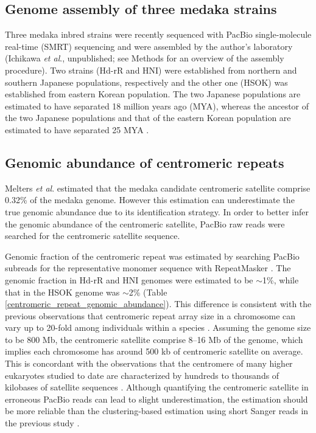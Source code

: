 \subsection*{Genome assembly of three medaka strains}
  Three medaka inbred strains were recently sequenced with PacBio single-molecule real-time (SMRT) sequencing and were assembled by the author's laboratory (Ichikawa \textit{et al}., unpublished; see Methods for an overview of the assembly procedure). Two strains (Hd-rR and HNI) were established from northern and southern Japanese populations, respectively and the other one (HSOK) was established from eastern Korean population. The two Japanese populations are estimated to have separated 18 million years ago (MYA), whereas the ancestor of the two Japanese populations and that of the eastern Korean population are estimated to have separated 25 MYA \cite{Setiamarga2009}.



\subsection*{Genomic abundance of centromeric repeats}
  Melters \textit{et al}. \cite{Melters2013} estimated that the medaka candidate centromeric satellite comprise 0.32\% of the medaka genome. However this estimation can underestimate the true genomic abundance due to its identification strategy. In order to better infer the genomic abundance of the centromeric satellite, PacBio raw reads were searched for the centromeric satellite sequence.

  Genomic fraction of the centromeric repeat was estimated by searching PacBio subreads for the representative monomer sequence with RepeatMasker \cite{}. The genomic fraction in Hd-rR and HNI genomes were estimated to be $\sim$1\%, while that in the HSOK genome was $\sim$2\% (Table \ref{centromeric_repeat_genomic_abundance}). This difference is consistent with the previous observations that centromeric repeat array size in a chromosome can vary up to 20-fold among individuals within a species \cite{Miga2014}. Assuming the genome size to be 800 Mb, the centromeric satellite comprise 8--16 Mb of the genome, which implies each chromosome has around 500 kb of centromeric satellite on average. This is concordant with the observations that the centromere of many higher eukaryotes studied to date are characterized by hundreds to thousands of kilobases of satellite sequences \cite{Plohl2014}. Although quantifying the centromeric satellite in erroneous PacBio reads can lead to slight underestimation, the estimation should be more reliable than the clustering-based estimation using short Sanger reads in the previous study \cite{Melters2013}.

